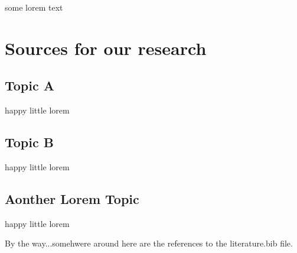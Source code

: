 \documentclass[titlepage, a4paper, 11pt]{scrartcl}
\begin{document}
some lorem text

\section{Sources for our research}

\subsection{Topic A}

happy little lorem

\subsection{Topic B}

happy little lorem

\subsection{Aonther Lorem Topic}

happy little lorem

By the way...somehwere around here are the references to the literature.bib file.

 

\end{document}
